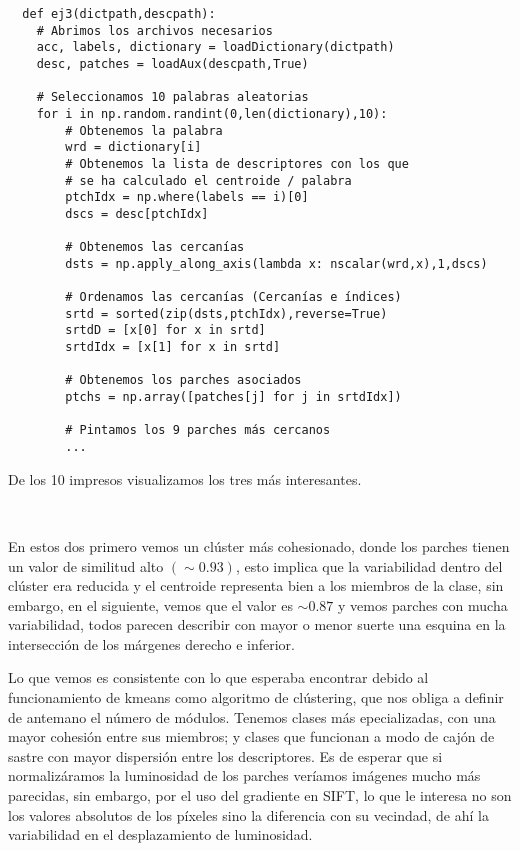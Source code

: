 \documentclass{article}
\newcommand{\img}[2]{
\noindent\makebox[\textwidth][c]{\texttt{[image: imgs/\#1]}}%
}
\begin{document}
\begin{verbatim}
  def ej3(dictpath,descpath):
    # Abrimos los archivos necesarios
    acc, labels, dictionary = loadDictionary(dictpath)
    desc, patches = loadAux(descpath,True)
    
    # Seleccionamos 10 palabras aleatorias
    for i in np.random.randint(0,len(dictionary),10):
        # Obtenemos la palabra
        wrd = dictionary[i]
        # Obtenemos la lista de descriptores con los que
        # se ha calculado el centroide / palabra
        ptchIdx = np.where(labels == i)[0]
        dscs = desc[ptchIdx]

        # Obtenemos las cercanías
        dsts = np.apply_along_axis(lambda x: nscalar(wrd,x),1,dscs)

        # Ordenamos las cercanías (Cercanías e índices)
        srtd = sorted(zip(dsts,ptchIdx),reverse=True)
        srtdD = [x[0] for x in srtd]
        srtdIdx = [x[1] for x in srtd]
		
        # Obtenemos los parches asociados
        ptchs = np.array([patches[j] for j in srtdIdx])
		
        # Pintamos los 9 parches más cercanos
        ...
\end{verbatim}

De los 10 impresos visualizamos los tres más interesantes.

\img{ej3_1}{0.6}
\\

\img{ej3_3}{0.6}

En estos dos primero vemos un clúster más cohesionado, donde los parches tienen un valor de similitud alto $(\sim 0.93)$, esto implica que la variabilidad dentro del clúster era reducida y el centroide representa bien a los miembros de la clase, sin embargo, en el siguiente, vemos que el valor es $\sim 0.87$ y vemos parches con mucha variabilidad, todos parecen describir con mayor o menor suerte una esquina en la intersección de los márgenes derecho e inferior.

\img{ej3_4}{0.6}

Lo que vemos es consistente con lo que esperaba encontrar debido al funcionamiento de kmeans como algoritmo de clústering, que nos obliga a definir de antemano el número de módulos. Tenemos clases más epecializadas, con una mayor cohesión entre sus miembros; y clases que funcionan a modo de cajón de sastre con mayor dispersión entre los descriptores. Es de esperar que si normalizáramos la luminosidad de los parches veríamos imágenes mucho más parecidas, sin embargo, por el uso del gradiente en SIFT, lo que le interesa no son los valores absolutos de los píxeles sino la diferencia con su vecindad, de ahí la variabilidad en el desplazamiento de luminosidad.
\end{document}
